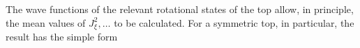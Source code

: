 The wave functions of the relevant rotational states of the top allow, in principle, the mean values of $J_\xi^2,\ldots$ to be calculated.
For a symmetric top, in particular, the result has the simple form
